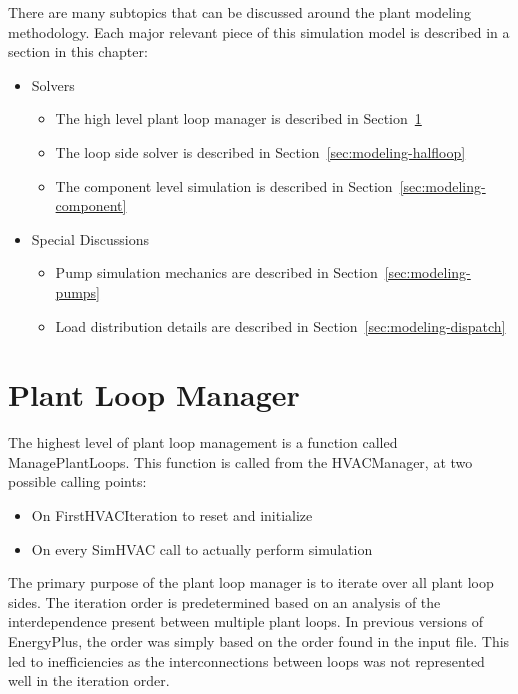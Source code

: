 \documentclass{report}
\begin{document}
        There are many subtopics that can be discussed around the plant modeling methodology.
        Each major relevant piece of this simulation model is described in a section in this chapter:

        \begin{itemize}
            \item Solvers
            \begin{itemize}
                \item The high level plant loop manager is described in Section~\ref{sec:modeling-loop}
                \item The loop side solver is described in Section~\ref{sec:modeling-halfloop}
                \item The component level simulation is described in Section~\ref{sec:modeling-component}
            \end{itemize}
            \item Special Discussions
            \begin{itemize}
                \item Pump simulation mechanics are described in Section~\ref{sec:modeling-pumps}
                \item Load distribution details are described in Section~\ref{sec:modeling-dispatch}
            \end{itemize}
        \end{itemize}

        \section{Plant Loop Manager}\label{sec:modeling-loop}

            The highest level of plant loop management is a function called ManagePlantLoops.
            This function is called from the HVACManager, at two possible calling points:

            \begin{itemize}
                \item On FirstHVACIteration to reset and initialize
                \item On every SimHVAC call to actually perform simulation
            \end{itemize}

            The primary purpose of the plant loop manager is to iterate over all plant loop sides.
            The iteration order is predetermined based on an analysis of the interdependence present between multiple plant loops.
            In previous versions of EnergyPlus, the order was simply based on the order found in the input file.
            This led to inefficiencies as the interconnections between loops was not represented well in the iteration order.
\end{document}
